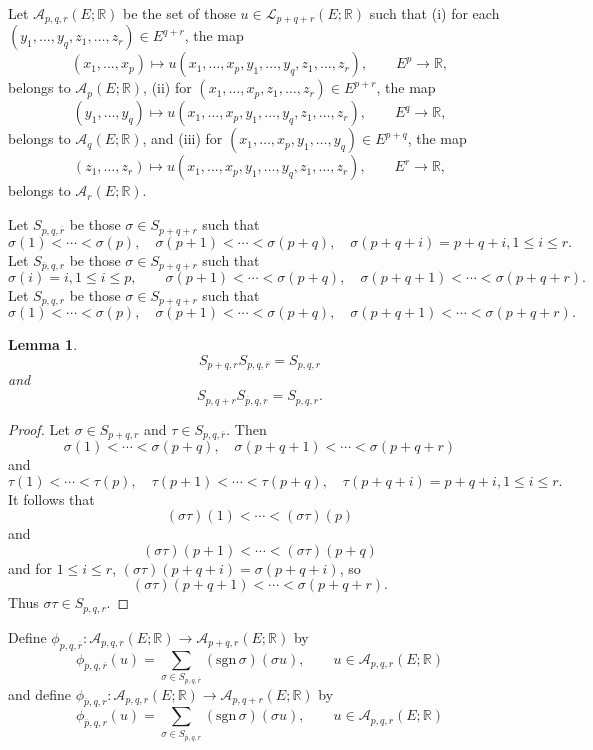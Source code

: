 \documentclass{article}
\newcommand{\sgn}{\mathrm{sgn}\,}
\newtheorem{lemma}[theorem]{Lemma}
\theoremstyle{definition}
\begin{document}
Let $\mathscr{A}_{p,q,r}(E;\mathbb{R})$ be the set of those
$u \in \mathscr{L}_{p+q+r}(E;\mathbb{R})$ such that (i) for each $(y_1,\ldots,y_q,z_1,\ldots,z_r) \in E^{q+r}$, the map
\[
(x_1,\ldots,x_p) \mapsto u(x_1,\ldots,x_p,y_1,\ldots,y_q,z_1,\ldots,z_r),\qquad
E^p \to \mathbb{R},
\]
belongs to $\mathscr{A}_p(E;\mathbb{R})$,  (ii)
for $(x_1,\ldots,x_p,z_1,\ldots,z_r) \in E^{p+r}$, the map
\[
(y_1,\ldots,y_q) \mapsto u(x_1,\ldots,x_p,y_1,\ldots,y_q,z_1,\ldots,z_r),
\qquad E^q \to \mathbb{R},
\]
belongs to $\mathscr{A}_q(E;\mathbb{R})$, and (iii)
for $(x_1,\ldots,x_p,y_1,\ldots,y_q) \in E^{p+q}$, the map
\[
(z_1,\ldots,z_r) \mapsto u(x_1,\ldots,x_p,y_1,\ldots,y_q,z_1,\ldots,z_r),
\qquad E^r \to \mathbb{R},
\]
belongs to $\mathscr{A}_r(E;\mathbb{R})$. 

Let $S_{p,q,\overline{r}}$ be those $\sigma \in S_{p+q+r}$ such that
\[
\sigma(1)<\cdots<\sigma(p),
\quad \sigma(p+1)<\cdots<\sigma(p+q),
\quad \sigma(p+q+i)=p+q+i, 1 \leq i \leq r.
\]
Let $S_{\overline{p},q,r}$ be those $\sigma \in S_{p+q+r}$ such that
\[
\sigma(i)=i, 1 \leq i \leq p,
\quad 
\quad \sigma(p+1)<\cdots<\sigma(p+q),
\quad \sigma(p+q+1)<\cdots<\sigma(p+q+r).
\]
Let $S_{p,q,r}$ be those $\sigma \in S_{p+q+r}$ such that
\[
\sigma(1)<\cdots<\sigma(p),
\quad \sigma(p+1)<\cdots<\sigma(p+q),
\quad \sigma(p+q+1)<\cdots<\sigma(p+q+r).
\]


\begin{lemma}
\[
S_{p+q,r} S_{p,q,\overline{r}} = S_{p,q,r}
\]
and
\[
S_{p,q+r} S_{\overline{p},q,r} = S_{p,q,r}.
\]
\label{pqr}
\end{lemma}
\begin{proof}
Let $\sigma \in S_{p+q,r}$ and $\tau \in S_{p,q,\overline{r}}$. Then 
\[
\sigma(1)<\cdots<\sigma(p+q), \quad
\sigma(p+q+1)<\cdots<\sigma(p+q+r)
\]
and
\[
\tau(1)<\cdots<\tau(p),
\quad \tau(p+1)<\cdots<\tau(p+q),
\quad \tau(p+q+i)=p+q+i, 1 \leq i \leq r.
\]
It follows that
\[
(\sigma \tau)(1)<\cdots<(\sigma \tau)(p)
\]
and
\[
(\sigma \tau)(p+1)<\cdots<(\sigma \tau)(p+q)
\]
and for $1 \leq i \leq r$,
$(\sigma \tau)(p+q+i) = \sigma(p+q+i)$, so
\[
(\sigma \tau)(p+q+1)<\cdots<\sigma(p+q+r).
\]
Thus $\sigma \tau \in S_{p,q,r}$. 
\end{proof}



Define $\phi_{p,q,\overline{r}}:\mathscr{A}_{p,q,r}(E;\mathbb{R}) \to \mathscr{A}_{p+q,r}(E;\mathbb{R})$
by 
\[
\phi_{p,q,\overline{r}}(u) = \sum_{\sigma \in S_{p,q,\overline{r}}} (\sgn \sigma)(\sigma u),
\qquad u \in \mathscr{A}_{p,q,r}(E;\mathbb{R})
\]
and
define $\phi_{\overline{p},q,r}:\mathscr{A}_{p,q,r}(E;\mathbb{R}) \to \mathscr{A}_{p,q+r}(E;\mathbb{R})$
by 
\[
\phi_{\overline{p},q,r}(u) = \sum_{\sigma \in S_{\overline{p},q,r}} (\sgn \sigma)(\sigma u),
\qquad u \in \mathscr{A}_{p,q,r}(E;\mathbb{R})
\]
\end{document}
